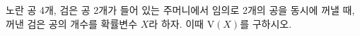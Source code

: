 노란 공 4개, 검은 공 2개가 들어 있는 주머니에서 임의로 2개의 공을 동시에 꺼낼 때, 꺼낸 검은 공의 개수를 확률변수 $X$라 하자. 이때 $\mathrm{V}(X)$를 구하시오.
